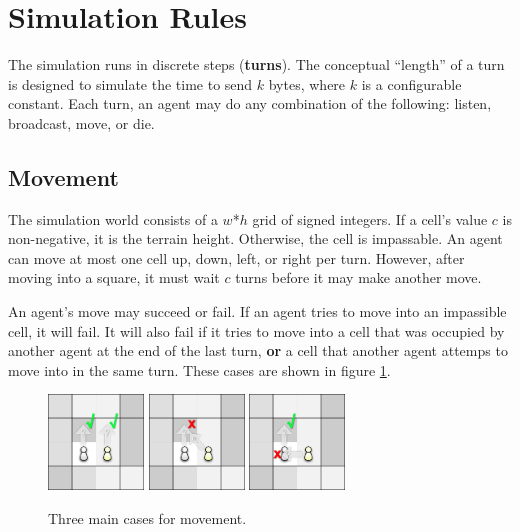\section{Simulation Rules} \label{rules}

The simulation runs in discrete steps (\textbf{turns}). The conceptual ``length'' of a turn is
designed to simulate the time to send $k$ bytes, where $k$ is a configurable constant. Each turn, an agent may do any combination of the following: listen, broadcast, move, or die.

\subsection{Movement}

The simulation world consists of a $w$*$h$ grid of signed integers. If a cell's value $c$ is
non-negative, it is the terrain height. Otherwise, the cell is impassable. An agent can move at most
one cell up, down, left, or right per turn. However, after moving into a square, it must wait $c$
turns before it may make another move.

An agent's move may succeed or fail. If an agent tries to move into an impassible cell, it will
fail. It will also fail if it tries to move into a cell that was occupied by another agent at the
end of the last turn, \textbf{or} a cell that another agent attemps to move into in the same turn.
These cases are shown in figure \ref{mvt}.

\begin{figure}[h!]
    \begin{center}
        \includegraphics[width=1in]{figures/mvt1.png}
        \includegraphics[width=1in]{figures/mvt2.png}
        \includegraphics[width=1in]{figures/mvt3.png}
    \end{center}
    \caption{Three main cases for movement.}
    \label{mvt}
\end{figure}

